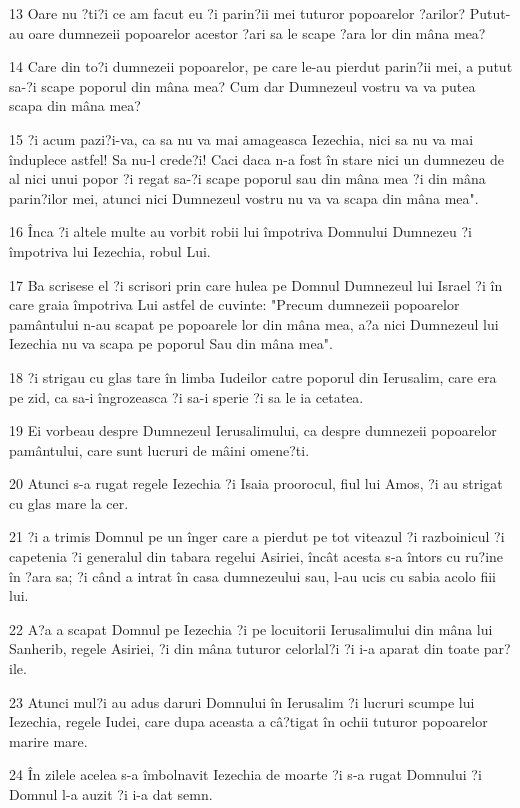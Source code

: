 \par 13 Oare nu ?ti?i ce am facut eu ?i parin?ii mei tuturor popoarelor ?arilor? Putut-au oare dumnezeii popoarelor acestor ?ari sa le scape ?ara lor din mâna mea?
\par 14 Care din to?i dumnezeii popoarelor, pe care le-au pierdut parin?ii mei, a putut sa-?i scape poporul din mâna mea? Cum dar Dumnezeul vostru va va putea scapa din mâna mea?
\par 15 ?i acum pazi?i-va, ca sa nu va mai amageasca Iezechia, nici sa nu va mai înduplece astfel! Sa nu-l crede?i! Caci daca n-a fost în stare nici un dumnezeu de al nici unui popor ?i regat sa-?i scape poporul sau din mâna mea ?i din mâna parin?ilor mei, atunci nici Dumnezeul vostru nu va va scapa din mâna mea".
\par 16 Înca ?i altele multe au vorbit robii lui împotriva Domnului Dumnezeu ?i împotriva lui Iezechia, robul Lui.
\par 17 Ba scrisese el ?i scrisori prin care hulea pe Domnul Dumnezeul lui Israel ?i în care graia împotriva Lui astfel de cuvinte: "Precum dumnezeii popoarelor pamântului n-au scapat pe popoarele lor din mâna mea, a?a nici Dumnezeul lui Iezechia nu va scapa pe poporul Sau din mâna mea".
\par 18 ?i strigau cu glas tare în limba Iudeilor catre poporul din Ierusalim, care era pe zid, ca sa-i îngrozeasca ?i sa-i sperie ?i sa le ia cetatea.
\par 19 Ei vorbeau despre Dumnezeul Ierusalimului, ca despre dumnezeii popoarelor pamântului, care sunt lucruri de mâini omene?ti.
\par 20 Atunci s-a rugat regele Iezechia ?i Isaia proorocul, fiul lui Amos, ?i au strigat cu glas mare la cer.
\par 21 ?i a trimis Domnul pe un înger care a pierdut pe tot viteazul ?i razboinicul ?i capetenia ?i generalul din tabara regelui Asiriei, încât acesta s-a întors cu ru?ine în ?ara sa; ?i când a intrat în casa dumnezeului sau, l-au ucis cu sabia acolo fiii lui.
\par 22 A?a a scapat Domnul pe Iezechia ?i pe locuitorii Ierusalimului din mâna lui Sanherib, regele Asiriei, ?i din mâna tuturor celorlal?i ?i i-a aparat din toate par?ile.
\par 23 Atunci mul?i au adus daruri Domnului în Ierusalim ?i lucruri scumpe lui Iezechia, regele Iudei, care dupa aceasta a câ?tigat în ochii tuturor popoarelor marire mare.
\par 24 În zilele acelea s-a îmbolnavit Iezechia de moarte ?i s-a rugat Domnului ?i Domnul l-a auzit ?i i-a dat semn.
